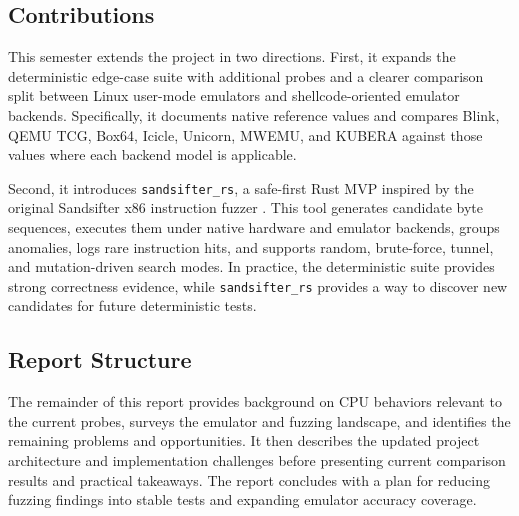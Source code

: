 \subsection{Contributions}

This semester extends the project in two directions. First, it expands the deterministic edge-case suite with additional probes and a clearer comparison split between Linux user-mode emulators and shellcode-oriented emulator backends. Specifically, it documents native reference values and compares Blink, QEMU TCG, Box64, Icicle, Unicorn, MWEMU, and KUBERA against those values where each backend model is applicable.

Second, it introduces \texttt{sandsifter\_rs}, a safe-first Rust MVP inspired by the original Sandsifter x86 instruction fuzzer \cite{domas2017sandsifter}. This tool generates candidate byte sequences, executes them under native hardware and emulator backends, groups anomalies, logs rare instruction hits, and supports random, brute-force, tunnel, and mutation-driven search modes. In practice, the deterministic suite provides strong correctness evidence, while \texttt{sandsifter\_rs} provides a way to discover new candidates for future deterministic tests.

\subsection{Report Structure}

The remainder of this report provides background on CPU behaviors relevant to the current probes, surveys the emulator and fuzzing landscape, and identifies the remaining problems and opportunities. It then describes the updated project architecture and implementation challenges before presenting current comparison results and practical takeaways. The report concludes with a plan for reducing fuzzing findings into stable tests and expanding emulator accuracy coverage.
